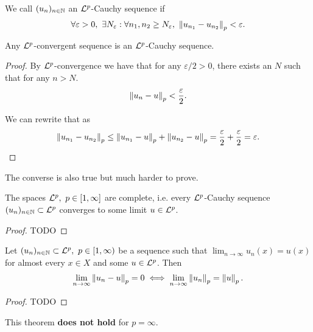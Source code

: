 \begin{dfn}
	\label{dfn:lp-cauchy}
	We call $(u_n)_{n\in\mathbb{N}}$ an $\mathcal{L}^p$-Cauchy sequence if
	\begin{align}
		\forall \varepsilon > 0,\ \exists N_\varepsilon : \forall n_1, n_2 \geq N_\varepsilon,\ \left\Vert{u_{n_1} - u_{n_2}}\right\Vert_p < \varepsilon.
	\end{align}
\end{dfn}

\begin{remark}
	Any $\mathcal{L}^p$-convergent sequence is an $\mathcal{L}^p$-Cauchy sequence.
\end{remark}

\begin{proof}
	By $\mathcal{L}^p$-convergence we have that for any $\varepsilon / 2 > 0$, there exists an $N$ such that for any $n > N$.
	\begin{align*}
		\left\Vert{u_n - u}\right\Vert_p < \frac{\varepsilon}{2}.
	\end{align*}
	
	We can rewrite that as
	\begin{align*}
		\left\Vert{u_{n_1} - u_{n_2}}\right\Vert_p
		\leq \left\Vert{u_{n_1} - u}\right\Vert_p + \left\Vert{u_{n_2} - u}\right\Vert_p
		= \frac{\varepsilon}{2} + \frac{\varepsilon}{2}
		= \varepsilon.
	\end{align*}
\end{proof}

The converse is also true but much harder to prove.

\begin{thm}
	The spaces $\mathcal{L}^p,\ p \in [1,\infty]$ are complete, i.e. every $\mathcal{L}^p$-Cauchy sequence $(u_n)_{n\in\mathbb{N}}\subset \mathcal{L}^p$ converges to some limit $u \in \mathcal{L}^p$.
\end{thm}

\begin{proof}
	TODO
\end{proof}

\begin{thm}[Riesz]
	Let $(u_n)_{n\in\mathbb{N}} \subset \mathcal{L}^p,\ p \in [1,\infty)$ be a sequence such that $\lim_{n\to\infty} u_n(x) = u(x)$ for almost every $x \in X$ and some $u \in \mathcal{L}^p$. Then
	\begin{align}
		\lim_{n\to\infty} \left\Vert{u_n - u}\right\Vert_p = 0 \iff \lim_{n\to\infty} \left\Vert{u_n}\right\Vert_p = \left\Vert{u}\right\Vert_p.
	\end{align}
\end{thm}

\begin{proof}
	TODO
\end{proof}

\begin{remark}
	This theorem \textbf{does not hold} for $p = \infty$.
\end{remark}
